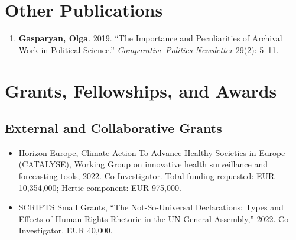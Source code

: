 \documentclass[10pt]{article}
\newcommand{\me}{\textbf{Gasparyan, Olga}}
\begin{document}
\section{Other Publications}
\begin{enumerate}
    \item \me. 2019. ``The Importance and Peculiarities of Archival Work in Political Science.'' \textit{Comparative Politics Newsletter} 29(2): 5--11.
\end{enumerate}

\section{Grants, Fellowships, and Awards}

\subsection{External and Collaborative Grants}
\begin{itemize}
    \item Horizon Europe, Climate Action To Advance Healthy Societies in Europe (CATALYSE), Working Group on innovative health surveillance and forecasting tools, 2022. Co-Investigator. Total funding requested: EUR 10,354,000; Hertie component: EUR 975,000.
    \item SCRIPTS Small Grants, ``The Not-So-Universal Declarations: Types and Effects of Human Rights Rhetoric in the UN General Assembly,'' 2022. Co-Investigator. EUR 40,000.
\end{itemize}
\end{document}
